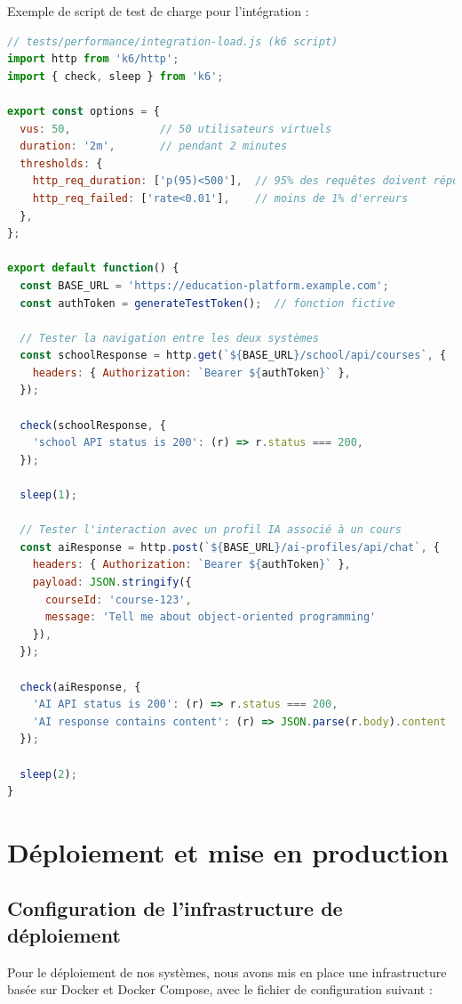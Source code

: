 Exemple de script de test de charge pour l'intégration :

\begin{lstlisting}[style=codestyle, language=JavaScript]
// tests/performance/integration-load.js (k6 script)
import http from 'k6/http';
import { check, sleep } from 'k6';

export const options = {
  vus: 50,              // 50 utilisateurs virtuels
  duration: '2m',       // pendant 2 minutes
  thresholds: {
    http_req_duration: ['p(95)<500'],  // 95% des requêtes doivent répondre en moins de 500ms
    http_req_failed: ['rate<0.01'],    // moins de 1% d'erreurs
  },
};

export default function() {
  const BASE_URL = 'https://education-platform.example.com';
  const authToken = generateTestToken();  // fonction fictive
  
  // Tester la navigation entre les deux systèmes
  const schoolResponse = http.get(`${BASE_URL}/school/api/courses`, {
    headers: { Authorization: `Bearer ${authToken}` },
  });
  
  check(schoolResponse, {
    'school API status is 200': (r) => r.status === 200,
  });
  
  sleep(1);
  
  // Tester l'interaction avec un profil IA associé à un cours
  const aiResponse = http.post(`${BASE_URL}/ai-profiles/api/chat`, {
    headers: { Authorization: `Bearer ${authToken}` },
    payload: JSON.stringify({
      courseId: 'course-123',
      message: 'Tell me about object-oriented programming'
    }),
  });
  
  check(aiResponse, {
    'AI API status is 200': (r) => r.status === 200,
    'AI response contains content': (r) => JSON.parse(r.body).content !== undefined,
  });
  
  sleep(2);
}
\end{lstlisting}

\section{Déploiement et mise en production}

\subsection{Configuration de l'infrastructure de déploiement}

Pour le déploiement de nos systèmes, nous avons mis en place une infrastructure basée sur Docker et Docker Compose, avec le fichier de configuration suivant :

